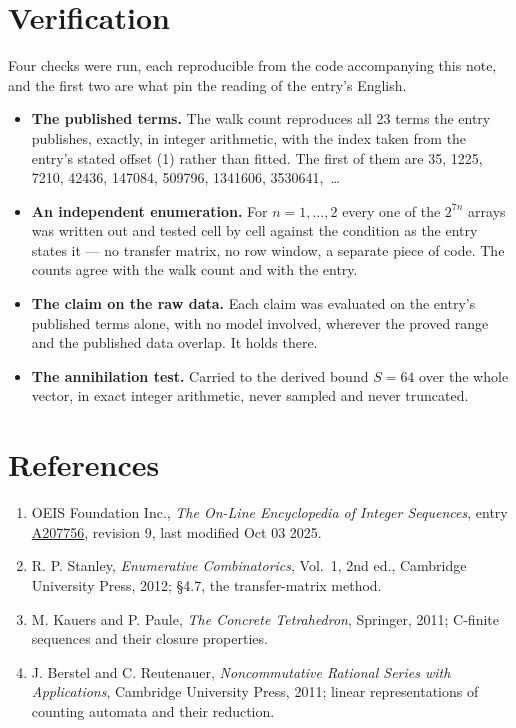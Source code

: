 \documentclass[11pt]{article}
\theoremstyle{definition}
\begin{document}
\section{Verification}

Four checks were run, each reproducible from the code accompanying this note, and the first two are what pin the reading of the entry's English.

\begin{itemize}

\item {\bfseries The published terms.} The walk count reproduces all 23 terms the entry publishes, exactly, in integer arithmetic, with the index taken from the entry's stated offset (1) rather than fitted. The first of them are 35, 1225, 7210, 42436, 147084, 509796, 1341606, 3530641,~\dots

\item {\bfseries An independent enumeration.} For $n = 1,\dots,2$ every one of the $2^{7n}$ arrays was written out and tested cell by cell against the condition as the entry states it --- no transfer matrix, no row window, a separate piece of code. The counts agree with the walk count and with the entry.

\item {\bfseries The claim on the raw data.} Each claim was evaluated on the entry's published terms alone, with no model involved, wherever the proved range and the published data overlap. It holds there.

\item {\bfseries The annihilation test.} Carried to the derived bound $S = 64$ over the whole vector, in exact integer arithmetic, never sampled and never truncated.

\end{itemize}

\section{References}

\begin{enumerate}

\item OEIS Foundation Inc., \emph{The On-Line Encyclopedia of Integer Sequences}, entry \href{https://oeis.org/A207756}{A207756}, revision 9, last modified Oct 03 2025.

\item R. P. Stanley, \emph{Enumerative Combinatorics}, Vol.~1, 2nd ed., Cambridge University Press, 2012; \S4.7, the transfer-matrix method.

\item M. Kauers and P. Paule, \emph{The Concrete Tetrahedron}, Springer, 2011; C-finite sequences and their closure properties.

\item J. Berstel and C. Reutenauer, \emph{Noncommutative Rational Series with Applications}, Cambridge University Press, 2011; linear representations of counting automata and their reduction.

\end{enumerate}
\end{document}
